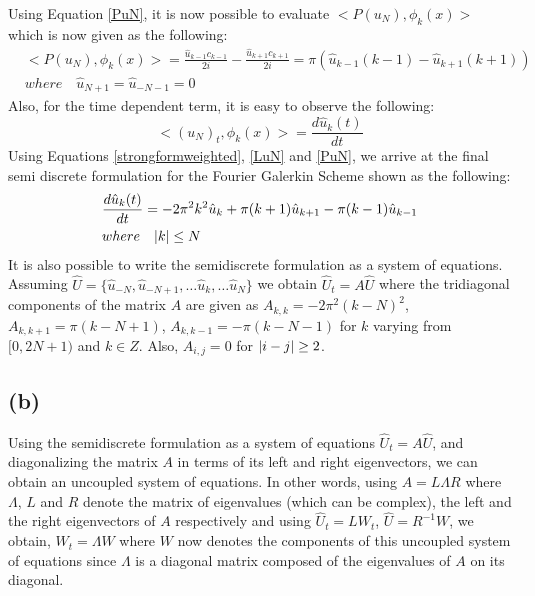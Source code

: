 \documentclass[12pt,dvipsnames]{article}
\DeclarePairedDelimiter\abs{\lvert}{\rvert}
\begin{document}
Using Equation \ref{PuN}, it is now possible to evaluate $<P(u_N), \phi_k(x)>$ which is now given as the following:
\begin{equation}
\begin{aligned}
    & <P(u_N), \phi_k(x)> = \frac{\hat{u}_{k - 1} c_{k - 1}}{2i} - \frac{\hat{u}_{k + 1} c_{k + 1}}{2i} = \pi\left( \hat{u}_{k - 1}(k - 1) - \hat{u}_{k + 1}(k + 1)  \right) \\
    & where \quad \hat{u}_{N + 1} = \hat{u}_{-N - 1} = 0
\end{aligned}
\label{projection_of_PuN}
\end{equation}
Also, for the time dependent term, it is easy to observe the following:
\begin{equation}
    <(u_N)_t, \phi_k(x)> = \frac{d \hat{u}_k(t)}{dt}
    \label{timedep}
\end{equation}
Using Equations \ref{strongformweighted}, \ref{LuN} and \ref{PuN}, we arrive at the final semi discrete formulation for the Fourier Galerkin Scheme shown as the following:
\begin{equation}
\begin{aligned}
    & \frac{d \hat{u}_k(t)}{dt} = - 2 \pi^2 k^2 \hat{u}_k + \pi (k + 1) \hat{u}_{k + 1} - \pi (k - 1) \hat{u}_{k - 1} \\
    & where \quad \abs{k} \leq N
\end{aligned}
\label{semidiscrete}
\end{equation}
It is also possible to write the semidiscrete formulation as a system of equations. Assuming $\hat{U} = \{ \hat{u}_{-N}, \hat{u}_{-N + 1}, \ldots \hat{u}_k, \ldots \hat{u}_{N} \}$ we obtain $\hat{U}_t = A\hat{U}$ where the tridiagonal components of the matrix $A$ are given as $A_{k,k} = - 2 \pi^2 (k - N)^2$, $A_{k, k+ 1} = \pi (k - N + 1)$, $A_{k, k - 1} = -\pi (k - N - 1)$ for $k$ varying from $[0, 2N + 1)$ and $k \in Z$. Also, $A_{i, j} = 0$ for $\abs{i - j} \geq 2$.

\subsection{(b)}
Using the semidiscrete formulation as a system of equations $\hat{U}_t = A\hat{U}$, and diagonalizing the matrix $A$ in terms of its left and right eigenvectors, we can obtain an uncoupled system of equations. In other words, using $A = L \Lambda R$ where $\Lambda$, $L$ and $R$ denote the matrix of eigenvalues (which can be complex), the left and the right eigenvectors of $A$ respectively and using $\hat{U}_t = LW_t$, $\hat{U} = R^{-1} W$, we obtain, $W_t = \Lambda W$ where $W$ now denotes the components of this uncoupled system of equations since $\Lambda$ is a diagonal matrix composed of the eigenvalues of $A$ on its diagonal. 
\end{document}

